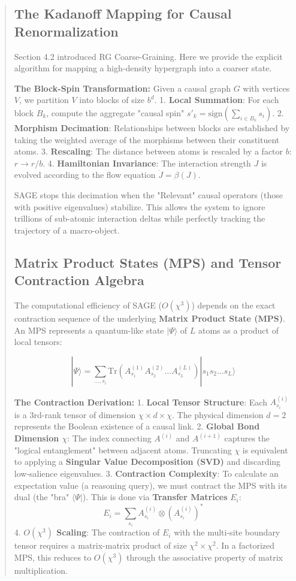 \documentclass[10pt,twocolumn,letterpaper]{article}
\begin{document}
\begin{abstract}
\subsection{The Kadanoff Mapping for Causal Renormalization}

Section 4.2 introduced RG Coarse-Graining. Here we provide the explicit algorithm for mapping a high-density hypergraph into a coarser state.

\textbf{The Block-Spin Transformation:}
Given a causal graph $G$ with vertices $V$, we partition $V$ into blocks of size $b^d$.
1.  \textbf{Local Summation}: For each block $B_k$, compute the aggregate "causal spin" $s'_k = \text{sign}\left(\sum_{i \in B_k} s_i\right)$.
2.  \textbf{Morphism Decimation}: Relationships between blocks are established by taking the weighted average of the morphisms between their constituent atoms.
3.  \textbf{Rescaling}: The distance between atoms is rescaled by a factor $b$: $r \to r/b$.
4.  \textbf{Hamiltonian Invariance}: The interaction strength $J$ is evolved according to the flow equation $\dot{J} = \beta(J)$. 

SAGE stops this decimation when the "Relevant" causal operators (those with positive eigenvalues) stabilize. This allows the system to ignore trillions of sub-atomic interaction deltas while perfectly tracking the trajectory of a macro-object.

\subsection{Matrix Product States (MPS) and Tensor Contraction Algebra}

The computational efficiency of SAGE ($O(\chi^3)$) depends on the exact contraction sequence of the underlying \textbf{Matrix Product State (MPS)}. An MPS represents a quantum-like state $|\Psi\rangle$ of $L$ atoms as a product of local tensors:

$$ |\Psi\rangle = \sum_{\dots, s_i} \text{Tr}(A_{s_1}^{(1)} A_{s_2}^{(2)} \dots A_{s_L}^{(L)}) |s_1 s_2 \dots s_L\rangle $$

\textbf{The Contraction Derivation:}
1.  \textbf{Local Tensor Structure}: Each $A_{s_i}^{(i)}$ is a 3rd-rank tensor of dimension $\chi \times d \times \chi$. The physical dimension $d = 2$ represents the Boolean existence of a causal link.
2.  \textbf{Global Bond Dimension $\chi$}: The index connecting $A^{(i)}$ and $A^{(i+1)}$ captures the "logical entanglement" between adjacent atoms. Truncating $\chi$ is equivalent to applying a \textbf{Singular Value Decomposition (SVD)} and discarding low-salience eigenvalues.
3.  \textbf{Contraction Complexity}: To calculate an expectation value (a reasoning query), we must contract the MPS with its dual (the "bra" $\langle\Psi|$). This is done via \textbf{Transfer Matrices} $E_i$:
    $$ E_i = \sum_{s_i} A_{s_i}^{(i)} \otimes (A_{s_i}^{(i)})^* $$
4.  \textbf{$O(\chi^3)$ Scaling}: The contraction of $E_i$ with the multi-site boundary tensor requires a matrix-matrix product of size $\chi^2 \times \chi^2$. In a factorized MPS, this reduces to $O(\chi^3)$ through the associative property of matrix multiplication.


\end{abstract}
\end{document}

